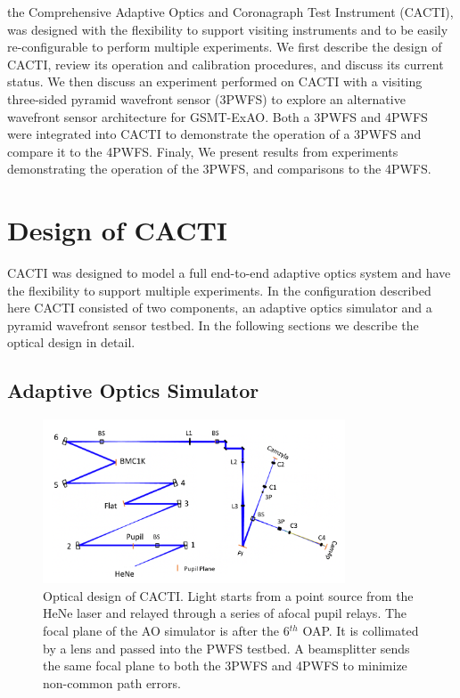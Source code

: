 the Comprehensive Adaptive Optics and Coronagraph Test Instrument (CACTI), was designed with the flexibility to support visiting instruments and to be easily re-configurable to perform multiple experiments. We first describe the design of CACTI, review its operation and calibration procedures, and discuss its current status. We then discuss an experiment performed on CACTI with a visiting three-sided pyramid wavefront sensor (3PWFS) to explore an alternative wavefront sensor architecture for GSMT-ExAO. Both a 3PWFS and 4PWFS were integrated into  CACTI to demonstrate the operation of a 3PWFS and compare it to the 4PWFS. Finaly, We present results from experiments demonstrating the operation of the 3PWFS, and comparisons to the 4PWFS.

\section{Design of CACTI}
CACTI was designed to model a full end-to-end adaptive optics system and have the flexibility to support multiple experiments. In the configuration described here CACTI consisted of two components, an adaptive optics simulator and a pyramid wavefront sensor testbed. In the following sections we describe the optical design in detail. 

\subsection{Adaptive Optics Simulator}

\begin{figure}
    \centering
    \includegraphics[width=0.8\textwidth]{Chapter Materials/Chapter Five Materials/CACTIzemax.png}
    \caption{Optical design of CACTI. Light starts from a point source from the HeNe laser and relayed through a series of afocal pupil relays. The focal plane of the AO simulator is after the 6${^{th}}$ OAP. It is collimated by a lens and passed into the PWFS testbed. A beamsplitter sends the same focal plane to both the 3PWFS and 4PWFS to minimize non-common path errors.}
    \label{fig:CACTIZemax}
\end{figure}

